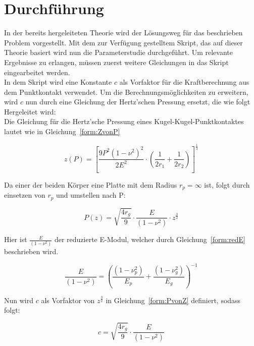 \chapter{Durchführung}
\label{chap:Durchfuehrung}

In der bereits hergeleiteten Theorie wird der Lösungsweg für das beschrieben Problem vorgestellt. Mit dem zur Verfügung gestelltem Skript, das auf dieser Theorie basiert wird nun die Parameterstudie durchgeführt. Um relevante Ergebnisse zu erlangen, müssen zuerst weitere Gleichungen in das Skript eingearbeitet werden.\\
In dem Skript wird eine Konstante $c$ als Vorfaktor für die Kraftberechnung aus dem Punktkontakt verwendet. Um die Berechnungsmöglichkeiten zu erweitern, wird $c$ nun durch eine Gleichung der Hertz'schen Pressung ersetzt, die wie folgt Hergeleitet wird:\\
Die Gleichung für die Hertz'sche Pressung eines Kugel-Kugel-Punktkontaktes lautet wie in Gleichung~\ref{form:ZvonP}

\begin{equation}
	\label{form:ZvonP}
	z(P) = \left[ \frac{9 P^{2} (1 - \nu^{2})^{2}}{2 E^{2}} \cdot \left( \frac{1}{2 r_{1}} + \frac{1}{2 r_{2}} \right) \right]^{\frac{1}{3}}
\end{equation}

Da einer der beiden Körper eine Platte mit dem Radius $r_{p} = \infty$ ist, folgt durch einsetzen von $r_{p}$ und umstellen nach P:

\begin{equation}
	\label{form:PvonZ}
	P(z) = \sqrt{\frac{4 r_{g}}{9}} \cdot \frac{E}{(1 - \nu^{2})} \cdot z^{\frac{3}{2}}
\end{equation}
	
Hier ist $\frac{E}{(1 - \nu^{2})}$ der reduzierte E-Modul, welcher durch Gleichung~\ref{form:redE} beschrieben wird.

\begin{equation}
	\label{form:redE}
	\frac{E}{(1 - \nu^{2})} = \left( \frac{(1 - \nu_{p}^{2})}{E_{p}} + \frac{(1 - \nu_{g}^{2})}{E_{g}} \right)^{-1}
\end{equation} 

Nun wird $c$ als Vorfaktor von $z^{\frac{3}{2}}$ in Gleichung~\ref{form:PvonZ} definiert, sodass folgt:

\begin{equation}
	\label{form:c}
	c = \sqrt{\frac{4 r_{g}}{9}} \cdot \frac{E}{(1 - \nu^{2})}
\end{equation}

